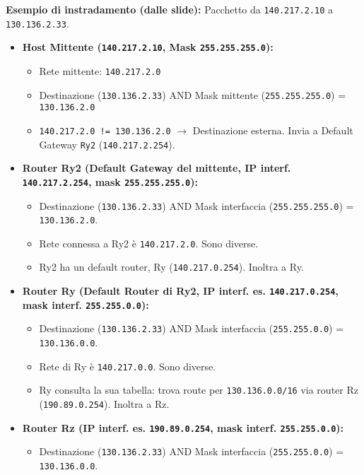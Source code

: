 \textbf{Esempio di instradamento (dalle slide):} Pacchetto da \texttt{140.217.2.10} a \texttt{130.136.2.33}.
\begin{itemize}
    \item \textbf{Host Mittente (\texttt{140.217.2.10}, Mask \texttt{255.255.255.0}):}
    \begin{itemize}
        \item Rete mittente: \texttt{140.217.2.0}
        \item Destinazione (\texttt{130.136.2.33}) AND Mask mittente (\texttt{255.255.255.0}) = \texttt{130.136.2.0}
        \item \texttt{140.217.2.0 != 130.136.2.0} $\rightarrow$ Destinazione esterna. Invia a Default Gateway \texttt{Ry2} (\texttt{140.217.2.254}).
    \end{itemize}
    \item \textbf{Router Ry2 (Default Gateway del mittente, IP interf. \texttt{140.217.2.254}, mask \texttt{255.255.255.0}):}
    \begin{itemize}
        \item Destinazione (\texttt{130.136.2.33}) AND Mask interfaccia (\texttt{255.255.255.0}) = \texttt{130.136.2.0}.
        \item Rete connessa a Ry2 è \texttt{140.217.2.0}. Sono diverse.
        \item Ry2 ha un default router, Ry (\texttt{140.217.0.254}). Inoltra a Ry.
    \end{itemize}
    \item \textbf{Router Ry (Default Router di Ry2, IP interf. es. \texttt{140.217.0.254}, mask interf. \texttt{255.255.0.0}):}
    \begin{itemize}
        \item Destinazione (\texttt{130.136.2.33}) AND Mask interfaccia (\texttt{255.255.0.0}) = \texttt{130.136.0.0}.
        \item Rete di Ry è \texttt{140.217.0.0}. Sono diverse.
        \item Ry consulta la sua tabella: trova route per \texttt{130.136.0.0/16} via router Rz (\texttt{190.89.0.254}). Inoltra a Rz.
    \end{itemize}
    \item \textbf{Router Rz (IP interf. es. \texttt{190.89.0.254}, mask interf. \texttt{255.255.0.0}):}
    \begin{itemize}
        \item Destinazione (\texttt{130.136.2.33}) AND Mask interfaccia (\texttt{255.255.0.0}) = \texttt{130.136.0.0}.

\end{itemize}
\end{itemize}
